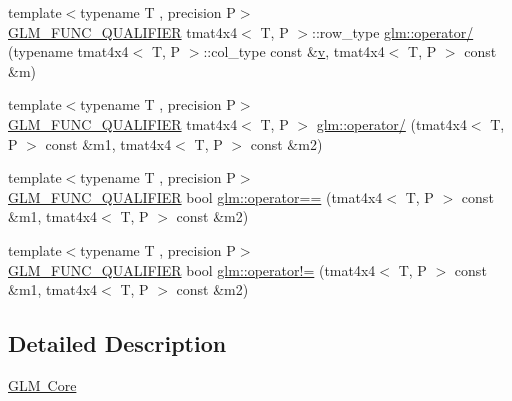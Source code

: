 \begin{DoxyCompactItemize}
\item 
{\footnotesize template$<$typename T , precision P$>$ }\\\mbox{\hyperlink{setup_8hpp_a33fdea6f91c5f834105f7415e2a64407}{G\+L\+M\+\_\+\+F\+U\+N\+C\+\_\+\+Q\+U\+A\+L\+I\+F\+I\+ER}} tmat4x4$<$ T, P $>$\+::row\+\_\+type \mbox{\hyperlink{namespaceglm_af41edbb529eca615b9f65e625fae2bab}{glm\+::operator/}} (typename tmat4x4$<$ T, P $>$\+::col\+\_\+type const \&\mbox{\hyperlink{glad_8h_a14cfbe2fc2234f5504618905b69d1e06}{v}}, tmat4x4$<$ T, P $>$ const \&m)
\item 
{\footnotesize template$<$typename T , precision P$>$ }\\\mbox{\hyperlink{setup_8hpp_a33fdea6f91c5f834105f7415e2a64407}{G\+L\+M\+\_\+\+F\+U\+N\+C\+\_\+\+Q\+U\+A\+L\+I\+F\+I\+ER}} tmat4x4$<$ T, P $>$ \mbox{\hyperlink{namespaceglm_a53cc97cdb468d042fd35bfd46d35fbc0}{glm\+::operator/}} (tmat4x4$<$ T, P $>$ const \&m1, tmat4x4$<$ T, P $>$ const \&m2)
\item 
{\footnotesize template$<$typename T , precision P$>$ }\\\mbox{\hyperlink{setup_8hpp_a33fdea6f91c5f834105f7415e2a64407}{G\+L\+M\+\_\+\+F\+U\+N\+C\+\_\+\+Q\+U\+A\+L\+I\+F\+I\+ER}} bool \mbox{\hyperlink{namespaceglm_a4a5a52bd72d27f2659923dcac3a41bd9}{glm\+::operator==}} (tmat4x4$<$ T, P $>$ const \&m1, tmat4x4$<$ T, P $>$ const \&m2)
\item 
{\footnotesize template$<$typename T , precision P$>$ }\\\mbox{\hyperlink{setup_8hpp_a33fdea6f91c5f834105f7415e2a64407}{G\+L\+M\+\_\+\+F\+U\+N\+C\+\_\+\+Q\+U\+A\+L\+I\+F\+I\+ER}} bool \mbox{\hyperlink{namespaceglm_a4f307dd12855db67708f7198042f419e}{glm\+::operator!=}} (tmat4x4$<$ T, P $>$ const \&m1, tmat4x4$<$ T, P $>$ const \&m2)
\end{DoxyCompactItemize}


\subsection{Detailed Description}
\mbox{\hyperlink{group__core}{G\+LM Core}} 